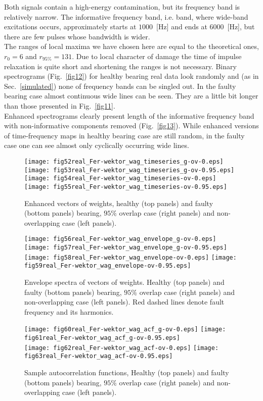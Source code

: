 \documentclass[3p,times]{elsarticle}
\begin{document}
Both signals contain a high-energy contamination, but its frequency band is relatively narrow. The informative frequency band, i.e. band, where wide-band excitations occurs, approximately starts at $1000$~[Hz] and ends at $6000$~[Hz], but there are few pulses whose bandwidth is wider.\\
The ranges of local maxima we have chosen here are equal to the theoretical ones, $r_0 =6$ and $r_{95\%} =131$. Due to local character of damage the time of impulse relaxation is quite short and shortening the ranges is not necessary. Binary spectrograms (Fig.~\ref{fig12}) for healthy bearing real data look randomly and (as in Sec.~\ref{simulated}) none of frequency bands can be singled out. In the faulty bearing case almost continuous wide lines can be seen. They are a little bit longer than those presented in Fig.~\ref{fig11}.\\
Enhanced spectrograms clearly present length of the informative frequency band with non-informative components removed (Fig.~\ref{fig13}). While enhanced versions of time-frequency maps in healthy bearing case are still random, in the faulty case one can see almost only cyclically occurring wide lines.\\
\begin{figure}[!ht]
\begin{center}
\texttt{[image: fig52real\_Fer-wektor\_wag\_timeseries\_g-ov-0.eps]}
\texttt{[image: fig53real\_Fer-wektor\_wag\_timeseries\_g-ov-0.95.eps]}\\
\texttt{[image: fig54real\_Fer-wektor\_wag\_timeseries-ov-0.eps]}
\texttt{[image: fig55real\_Fer-wektor\_wag\_timeseries-ov-0.95.eps]}
\caption{Enhanced vectors of weights, healthy (top panels) and faulty (bottom panels) bearing, $95\%$ overlap case (right panels) and non-overlapping case (left panels).}
\label{fig14}
\texttt{[image: fig56real\_Fer-wektor\_wag\_envelope\_g-ov-0.eps]}
\texttt{[image: fig57real\_Fer-wektor\_wag\_envelope\_g-ov-0.95.eps]}\\
\texttt{[image: fig58real\_Fer-wektor\_wag\_envelope-ov-0.eps]}
\texttt{[image: fig59real\_Fer-wektor\_wag\_envelope-ov-0.95.eps]}
\caption{Envelope spectra of vectors of weights. Healthy (top panels) and faulty (bottom panels) bearing, $95\%$ overlap case (right panels) and non-overlapping case (left panels). Red dashed lines denote fault frequency and its harmonics.}
\label{fig15}
\texttt{[image: fig60real\_Fer-wektor\_wag\_acf\_g-ov-0.eps]}
\texttt{[image: fig61real\_Fer-wektor\_wag\_acf\_g-ov-0.95.eps]}\\
\texttt{[image: fig62real\_Fer-wektor\_wag\_acf-ov-0.eps]}
\texttt{[image: fig63real\_Fer-wektor\_wag\_acf-ov-0.95.eps]}
\caption{Sample autocorrelation functions, Healthy (top panels) and faulty (bottom panels) bearing, $95\%$ overlap case (right panels) and non-overlapping case (left panels).}
\label{fig16}
\end{center}
\end{figure}
\end{document}
